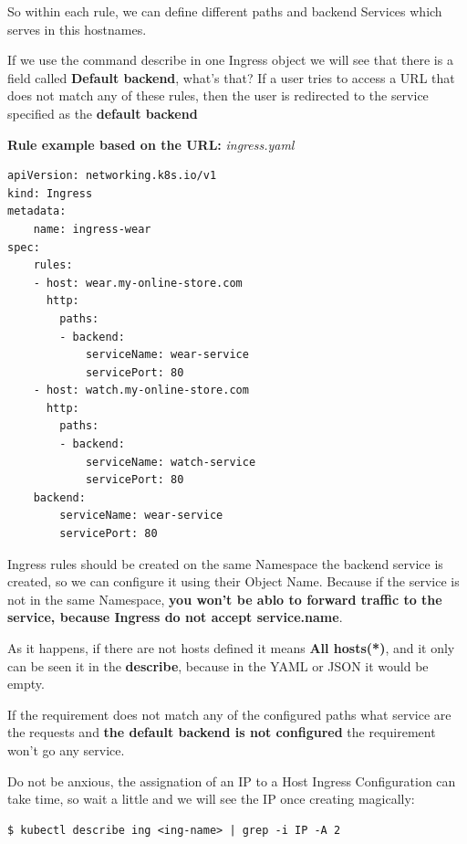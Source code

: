 \documentclass{article}
\newenvironment{blocktemplate}[1]{%
    \tcolorbox[beamer,%
    noparskip,breakable,
    colframe=Blue,%
    colbacklower=LimeGreen!75!LightGreen,%
    title=#1]}%
    {\endtcolorbox}
\newenvironment{blocktemplateII}[1]{%
    \tcolorbox[beamer,%
    noparskip,breakable,
    colframe=Green,%
    colbacklower=LimeGreen!75!LightGreen,%
    title=#1]}%
    {\endtcolorbox}
\newenvironment{blocktemplateIII}[1]{%
    \tcolorbox[beamer,%
    noparskip,breakable,
    ,colframe=Red,%
    colbacklower=LimeGreen!75!LightGreen,%
    title=#1]}%
    {\endtcolorbox}
\newenvironment{codetemplate}[1][]{%
  \mybasecolorbox[#1]
  \itshape
}{%
  \endmybasecolorbox
}
\begin{document}
So within each rule, we can define different paths and backend Services which serves in this hostnames.

\begin{blocktemplate}{NOTE}
If we use the command describe in one Ingress object we will see that there is a field called \textbf{Default backend}, what's that? If a user tries to access a URL that does not match any of these rules, then the user is redirected to the service specified as the \textbf{default backend}
\end{blocktemplate}

\textbf{Rule example based on the URL:}
\begin{codetemplate}{ingress.yaml}
\begin{verbatim}
apiVersion: networking.k8s.io/v1
kind: Ingress
metadata:
    name: ingress-wear
spec:
    rules:
    - host: wear.my-online-store.com
      http:
        paths:
        - backend:
            serviceName: wear-service
            servicePort: 80
    - host: watch.my-online-store.com
      http: 
        paths:
        - backend:
            serviceName: watch-service
            servicePort: 80
    backend:
        serviceName: wear-service
        servicePort: 80
\end{verbatim}
\end{codetemplate}

\begin{blocktemplateIII}{WARNING}
Ingress rules should be created on the same Namespace the backend service is created, so we can configure it using their Object Name. 
Because if the service is not in the same Namespace, \textbf{you won't be ablo to forward traffic to the service, 
because Ingress do not accept service.name}.
\end{blocktemplateIII}

\begin{blocktemplateIII}{WARNING}
As it happens, if there are not hosts defined it means \textbf{All hosts(*)}, and it only can be seen it in the \textbf{describe}, because in the YAML or JSON it would be empty.
\end{blocktemplateIII}

\begin{blocktemplateIII}{WARNING}
If the requirement does not match any of the configured paths what service are the requests and \textbf{the default backend is not configured} the requirement won't go any service.
\end{blocktemplateIII}

\begin{blocktemplateII}{NOTE}
Do not be anxious, the assignation of an IP to a Host Ingress Configuration can take time, so wait a little and we will see the IP once creating magically:
\begin{codetemplate}{}
\begin{verbatim}
$ kubectl describe ing <ing-name> | grep -i IP -A 2
\end{verbatim}
\end{codetemplate}
\end{blocktemplateII}
\end{document}
